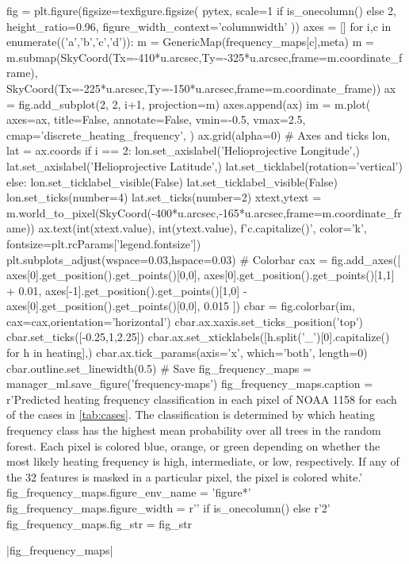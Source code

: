\begin{pycode}[manager_ml]
fig = plt.figure(figsize=texfigure.figsize(
    pytex,
    scale=1 if is_onecolumn() else 2,
    height_ratio=0.96,
    figure_width_context='columnwidth'
))
axes = []
for i,c in enumerate(('a','b','c','d')):
    m = GenericMap(frequency_maps[c],meta)
    m = m.submap(SkyCoord(Tx=-410*u.arcsec,Ty=-325*u.arcsec,frame=m.coordinate_frame),
                 SkyCoord(Tx=-225*u.arcsec,Ty=-150*u.arcsec,frame=m.coordinate_frame))
    ax = fig.add_subplot(2, 2, i+1, projection=m)
    axes.append(ax)
    im = m.plot(
        axes=ax,
        title=False,
        annotate=False,
        vmin=-0.5,
        vmax=2.5,
        cmap='discrete_heating_frequency',
    )
    ax.grid(alpha=0)
    # Axes and ticks
    lon, lat = ax.coords
    if i == 2:
        lon.set_axislabel('Helioprojective Longitude',)
        lat.set_axislabel('Helioprojective Latitude',)
        lat.set_ticklabel(rotation='vertical')
    else:
        lon.set_ticklabel_visible(False)
        lat.set_ticklabel_visible(False)
    lon.set_ticks(number=4)
    lat.set_ticks(number=2)
    xtext,ytext = m.world_to_pixel(SkyCoord(-400*u.arcsec,-165*u.arcsec,frame=m.coordinate_frame))
    ax.text(int(xtext.value), int(ytext.value), f'{c.capitalize()}', color='k', fontsize=plt.rcParams['legend.fontsize'])
plt.subplots_adjust(wspace=0.03,hspace=0.03)
# Colorbar
cax = fig.add_axes([
    axes[0].get_position().get_points()[0,0],
    axes[0].get_position().get_points()[1,1] + 0.01,
    axes[-1].get_position().get_points()[1,0] - axes[0].get_position().get_points()[0,0],
    0.015
])
cbar = fig.colorbar(im, cax=cax,orientation='horizontal')
cbar.ax.xaxis.set_ticks_position('top')
cbar.set_ticks([-0.25,1,2.25])
cbar.ax.set_xticklabels([h.split('_')[0].capitalize() for h in heating],)
cbar.ax.tick_params(axis='x', which='both', length=0)
cbar.outline.set_linewidth(0.5)
# Save
fig_frequency_maps = manager_ml.save_figure('frequency-maps')
fig_frequency_maps.caption = r'Predicted heating frequency classification in each pixel of NOAA 1158 for each of the cases in \autoref{tab:cases}. The classification is determined by which heating frequency class has the highest mean probability over all trees in the random forest. Each pixel is colored blue, orange, or green depending on whether the most likely heating frequency is high, intermediate, or low, respectively. If any of the 32 features is masked in a particular pixel, the pixel is colored white.'
fig_frequency_maps.figure_env_name = 'figure*'
fig_frequency_maps.figure_width = r'\columnwidth' if is_onecolumn() else r'2\columnwidth'
fig_frequency_maps.fig_str = fig_str
\end{pycode}
\py[manager_ml]|fig_frequency_maps|

